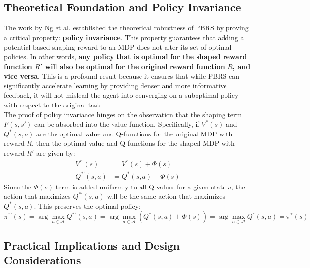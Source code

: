 \subsection{Theoretical Foundation and Policy Invariance}

The work by Ng et al. \cite{ng1999policy} established the theoretical robustness of PBRS by proving a critical property: \textbf{policy invariance}. 
This property guarantees that adding a potential-based shaping reward to an MDP does not alter its set of optimal policies. In other words, \textbf{any policy that is optimal for the shaped reward function $R'$ will also be optimal for the original reward function $R$, and vice versa}. This is a profound result because it ensures that while PBRS can significantly accelerate learning by providing denser and more informative feedback, it will not mislead the agent into converging on a suboptimal policy with respect to the original task.
\\
\noindent
The proof of policy invariance hinges on the observation that the shaping term $F(s, s')$ can be absorbed into the value function. Specifically, if $V^*(s)$ and $Q^*(s,a)$ are the optimal value and Q-functions for the original MDP with reward $R$, then the optimal value and Q-functions for the shaped MDP with reward $R'$ are given by:
\begin{align*}
V^{*'}(s) &= V^*(s) + \Phi(s) \\
Q^{*'}(s,a) &= Q^*(s,a) + \Phi(s)
\end{align*}
Since the $\Phi(s)$ term is added uniformly to all Q-values for a given state $s$, the action that maximizes $Q^{*'}(s,a)$ will be the same action that maximizes $Q^*(s,a)$. This preserves the optimal policy:
\[
\pi^{*'}(s) = \arg\max_{a \in \mathcal{A}} Q^{*'}(s,a) = \arg\max_{a \in \mathcal{A}} (Q^*(s,a) + \Phi(s)) = \arg\max_{a \in \mathcal{A}} Q^*(s,a) = \pi^*(s)
\]


\subsection{Practical Implications and Design Considerations}

